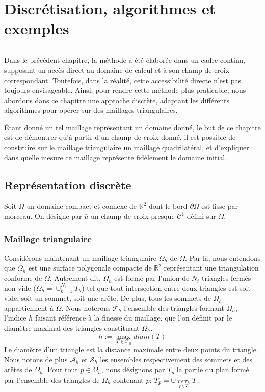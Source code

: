 \chapter{Discrétisation, algorithmes et exemples}
\label{chap:alorithme}
\minitoc

\[\]

Dans le précédent chapitre, la méthode a été élaborée dans un cadre continu, supposant un accès direct au domaine de calcul et à son champ de croix correspondant. Toutefois, dans la réalité, cette accessibilité directe n'est pas toujours envisageable. Ainsi, pour rendre cette méthode plus praticable, nous abordons dans ce chapitre une approche discrète, adaptant les différents algorithmes pour opérer sur des maillages triangulaires.

\'Etant donné un tel maillage représentant un domaine donné, le but de ce chapitre est de démontrer qu'à partir d'un champ de croix donné, il est possible de construire sur le maillage triangulaire un maillage quadrilatéral, et d'expliquer dans quelle mesure ce maillage représente fidèlement le domaine initial.

\section{Représentation discrète}
\label{sec:repr_discrete}
Soit $\Omega$ un domaine compact et connexe de $\mathbb{R}^2$ dont le bord $\partial\Omega$ est lisse par morceau. On désigne par $\bar{u}$ un champ de croix presque-$\mathcal{C}^1$ défini sur $\Omega$.

\subsection{Maillage triangulaire}

Considérons maintenant un maillage triangulaire $\Omega_h$ de $\Omega$. Par là, nous entendons que $\Omega_h$ est une surface polygonale compacte de $\mathbb{R}^2$ représentant une triangulation conforme de $\Omega$. Autrement dit, $\Omega_h$ est formé par l'union de $N_t$ triangles fermés non vide ($\Omega_h=\cup_{k=1}^{N_t}T_k$) tel que tout intersection entre deux triangles est soit vide, soit un sommet, soit une arête. De plus, tous les sommets de $\Omega_h$ appartiennent à $\Omega$. Nous noterons $\mathcal{T}_h$ l'ensemble des triangles formant $\Omega_h$, l'indice $h$ faisant référence à la finesse du maillage, que l’on définit par le diamètre maximal des triangles constituant $\Omega_h$.
$$
h:=\max_{T\in\mathcal{T}_h} diam(T)
$$
Le diamètre d’un triangle est la distance maximale entre deux points du triangle. Nous notons de plus $\mathcal{A}_h$ et $\mathcal{S}_h$ les ensembles respectivement des sommets et des arêtes de $\Omega_h$. Pour tout $p\in\Omega_h$, nous désignons par $T_p$ la partie du plan formé par l'ensemble des triangles de $\Omega_h$ contenant $p$: $T_p=\displaystyle\cup_{T\in\mathcal{T}_h\atop~p\in T~}T$.

